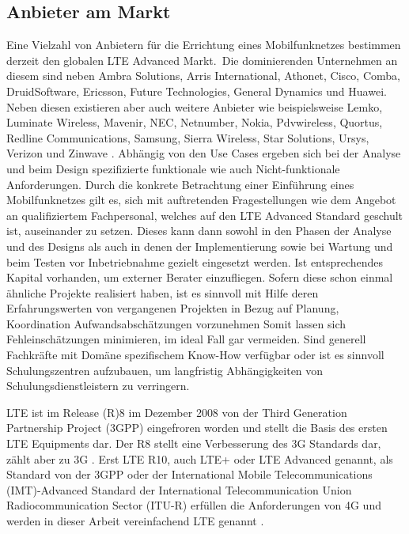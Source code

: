 	\subsection{Anbieter am Markt}
\label{subsec:Anbieter am Markt}
Eine Vielzahl von Anbietern für die Errichtung eines Mobilfunknetzes bestimmen derzeit den globalen LTE Advanced Markt.\ Die dominierenden Unternehmen an diesem sind neben Ambra Solutions, Arris International,
Athonet, Cisco, Comba, DruidSoftware, Ericsson, Future Technologies, General Dynamics und 
Huawei. Neben diesen existieren aber auch weitere Anbieter wie beispielsweise Lemko, Luminate Wireless,
Mavenir,
NEC,
Netnumber,
Nokia,
Pdvwireless,
Quortus,
Redline Communications,
Samsung,
Sierra Wireless,
Star Solutions,
Ursys,
Verizon und 
Zinwave \cite{Max19}.
Abhängig von den Use Cases ergeben sich bei der Analyse und beim Design spezifizierte funktionale wie auch Nicht-funktionale Anforderungen. Durch die konkrete Betrachtung einer Einführung eines Mobilfunknetzes gilt es, sich mit auftretenden Fragestellungen wie  dem Angebot an qualifiziertem Fachpersonal, welches auf den LTE Advanced Standard geschult ist, auseinander zu setzen. Dieses kann dann sowohl in den Phasen der Analyse und des Designs als auch in denen der Implementierung sowie bei Wartung und beim Testen vor Inbetriebnahme gezielt eingesetzt werden. Ist entsprechendes Kapital vorhanden, um externer Berater einzufliegen. Sofern diese schon einmal ähnliche Projekte realisiert haben, ist es sinnvoll mit Hilfe deren Erfahrungswerten von vergangenen Projekten in Bezug auf Planung, Koordination Aufwandsabschätzungen vorzunehmen Somit lassen sich Fehleinschätzungen minimieren, im ideal Fall gar vermeiden. Sind generell Fachkräfte mit Domäne spezifischem Know-How verfügbar oder ist es sinnvoll Schulungszentren aufzubauen, um langfristig Abhängigkeiten von Schulungsdienstleistern zu verringern.

LTE ist im Release (R)8 im Dezember 2008 von der Third Generation Partnership Project (3GPP)  eingefroren worden und stellt die Basis des ersten LTE Equipments dar. Der R8 stellt eine Verbesserung des 3G Standards dar, zählt aber zu 3G \cite[S. 32ff]{Zoi09}. Erst LTE R10, auch LTE+ oder LTE Advanced genannt, als Standard von der 3GPP oder der International Mobile Telecommunications (IMT)-Advanced Standard der International Telecommunication Union Radiocommunication Sector (ITU-R) erfüllen die Anforderungen von 4G und werden in dieser Arbeit vereinfachend LTE genannt \cite{Wan13}.

